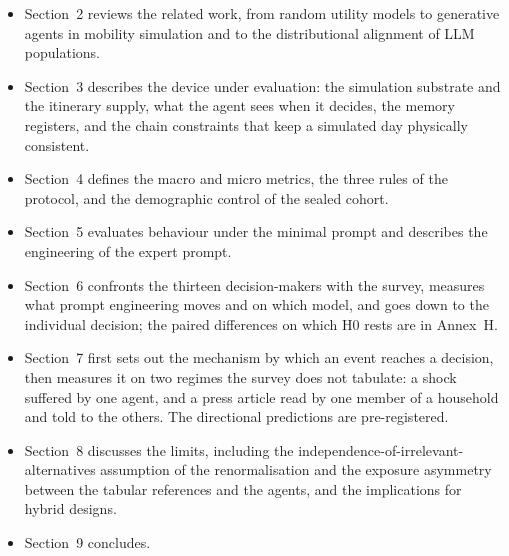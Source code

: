 \begin{itemize}
  \item Section~2 reviews the related work, from random utility models to generative agents in mobility simulation and to the distributional alignment of LLM populations.
  \item Section~3 describes the device under evaluation: the simulation substrate and the itinerary supply, what the agent sees when it decides, the memory registers, and the chain constraints that keep a simulated day physically consistent.
  \item Section~4 defines the macro and micro metrics, the three rules of the protocol, and the demographic control of the sealed cohort.
  \item Section~5 evaluates behaviour under the minimal prompt and describes the engineering of the expert prompt.
  \item Section~6 confronts the thirteen decision-makers with the survey, measures what prompt engineering moves and on which model, and goes down to the individual decision; the paired differences on which H0 rests are in Annex~H.
  \item Section~7 first sets out the mechanism by which an event reaches a decision, then measures it on two regimes the survey does not tabulate: a shock suffered by one agent, and a press article read by one member of a household and told to the others. The directional predictions are pre-registered.
  \item Section~8 discusses the limits, including the independence-of-irrelevant-alternatives assumption of the renormalisation and the exposure asymmetry between the tabular references and the agents, and the implications for hybrid designs.
  \item Section~9 concludes.
\end{itemize}
